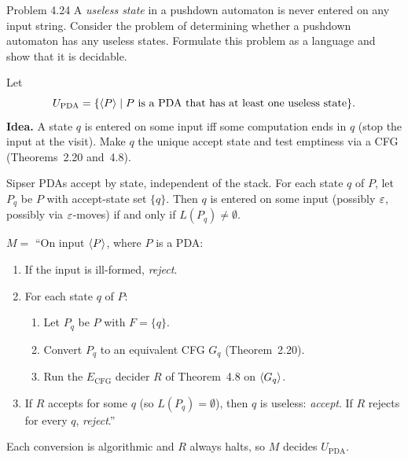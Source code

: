 \begin{question}{Problem 4.24}
A \emph{useless state} in a pushdown automaton is never entered on any input string. Consider the problem of determining whether a pushdown automaton has any useless states. Formulate this problem as a language and show that it is decidable.
\end{question}
\begin{soln}
Let
\[
U_{\mathrm{PDA}}=\{\langle P\rangle\mid P\text{ is a PDA that has at least one useless state}\}.
\]
\textbf{Idea.} A state $q$ is entered on some input iff some computation ends in $q$ (stop the input at the visit). Make $q$ the unique accept state and test emptiness via a CFG (Theorems~2.20 and~4.8).

Sipser PDAs accept by state, independent of the stack. For each state $q$ of $P$, let $P_q$ be $P$ with accept-state set $\{q\}$. Then $q$ is entered on some input (possibly $\varepsilon$, possibly via $\varepsilon$-moves) if and only if $L(P_q)\neq\emptyset$.

$M=$ ``On input $\langle P\rangle$, where $P$ is a PDA:
\begin{enumerate}
\item If the input is ill-formed, \emph{reject}.
\item For each state $q$ of $P$:
\begin{enumerate}
\item Let $P_q$ be $P$ with $F=\{q\}$.
\item Convert $P_q$ to an equivalent CFG $G_q$ (Theorem~2.20).
\item Run the $E_{\mathrm{CFG}}$ decider $R$ of Theorem~4.8 on $\langle G_q\rangle$.
\end{enumerate}
\item If $R$ accepts for some $q$ (so $L(P_q)=\emptyset$), then $q$ is useless: \emph{accept}. If $R$ rejects for every $q$, \emph{reject}.''
\end{enumerate}
Each conversion is algorithmic and $R$ always halts, so $M$ decides $U_{\mathrm{PDA}}$.
\end{soln}

